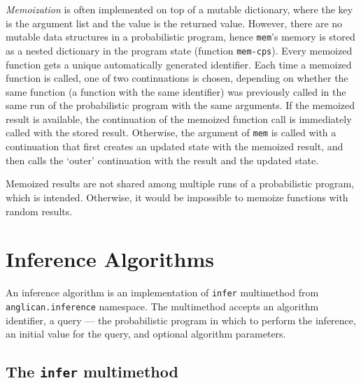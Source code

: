 \documentclass[preprint]{sigplanconf}
\begin{document}
\textit{Memoization} is often implemented on top of a mutable
dictionary, where the key is the argument list and the value is
the returned value. However, there are no mutable data
structures in a probabilistic program, hence \texttt{mem}'s
memory is stored as a nested dictionary in the program state
(function \texttt{mem-cps}).  Every memoized function gets a
unique automatically generated identifier. Each time a memoized
function is called, one of two continuations is chosen,
depending on whether the same function (a function with the same
identifier) was previously called in the same run of the
probabilistic program with the same arguments. If the memoized
result is available, the continuation of the memoized function
call is immediately called with the stored result. Otherwise,
the argument of \texttt{mem} is called with a continuation that
first creates an updated state with the memoized result, and
then calls the `outer' continuation with the result and the
updated state. 

Memoized results are not shared among multiple runs of a
probabilistic program, which is intended. Otherwise, it would be
impossible to memoize functions with random results.

\section{Inference Algorithms}

An inference algorithm is an implementation of \texttt{infer}
multimethod from \texttt{anglican.inference} namespace. The
multimethod accepts an algorithm identifier, a query --- the
probabilistic program in which to perform the inference, an
initial value for the query, and optional algorithm parameters.

\subsection{The \texttt{infer} multimethod}
\end{document}
